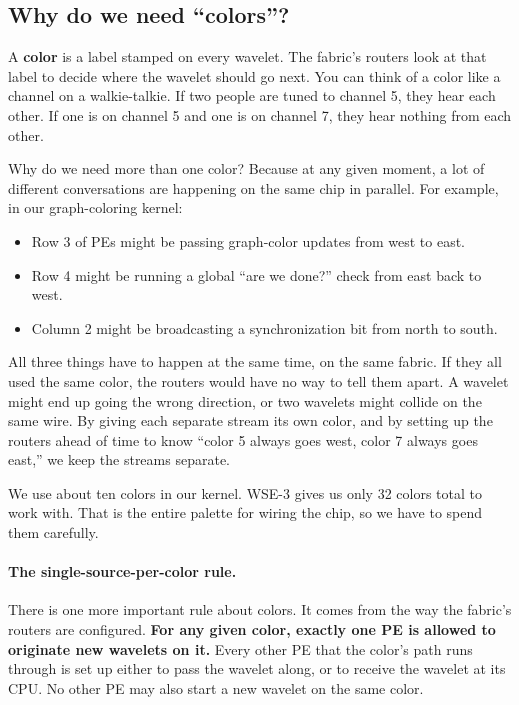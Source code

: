 \documentclass[11pt]{article}
\begin{document}
\subsection{Why do we need ``colors''?}

A \textbf{color} is a label stamped on every wavelet. The
fabric's routers look at that label to decide where the wavelet
should go next. You can think of a color like a channel on a
walkie-talkie. If two people are tuned to channel 5, they hear
each other. If one is on channel 5 and one is on channel 7,
they hear nothing from each other.

Why do we need more than one color? Because at any given moment,
a lot of different conversations are happening on the same chip
in parallel. For example, in our graph-coloring kernel:
\begin{itemize}[leftmargin=1.3em,itemsep=0.1em]
  \item Row 3 of PEs might be passing graph-color updates from
    west to east.
  \item Row 4 might be running a global ``are we done?'' check
    from east back to west.
  \item Column 2 might be broadcasting a synchronization bit
    from north to south.
\end{itemize}

All three things have to happen at the same time, on the same
fabric. If they all used the same color, the routers would have
no way to tell them apart. A wavelet might end up going the
wrong direction, or two wavelets might collide on the same wire.
By giving each separate stream its own color, and by setting up
the routers ahead of time to know ``color 5 always goes west,
color 7 always goes east,'' we keep the streams separate.

We use about ten colors in our kernel. WSE-3 gives us only 32
colors total to work with. That is the entire palette for
wiring the chip, so we have to spend them carefully.

\paragraph{The single-source-per-color rule.}
There is one more important rule about colors. It comes from
the way the fabric's routers are configured. \textbf{For any
given color, exactly one PE is allowed to originate new wavelets
on it.} Every other PE that the color's path runs through is
set up either to pass the wavelet along, or to receive the
wavelet at its CPU. No other PE may also start a new wavelet
on the same color.
\end{document}
